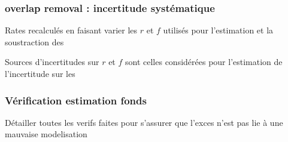 \begin{frame}
\frametitle{ overlap removal : incertitude systématique}

\begin{maliste}
\item Rates  recalculés en faisant varier les $r$ et $f$ utilisés pour l'estimation et la soustraction des 
\item Sources d'incertitudes sur $r$ et $f$ sont celles considérées pour l'estimation de l'incertitude sur les 
\end{maliste}
\end{frame}

\begin{frame}
\frametitle{Vérification estimation fonds}
\begin{maliste}
\item Détailler toutes les verifs faites pour s'assurer que l'exces n'est pas lie à une mauvaise modelisation
\end{maliste}
\end{frame}

